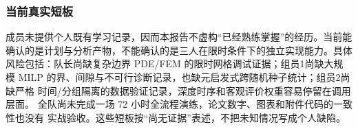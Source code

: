 \subsubsection{当前真实短板}

成员未提供个人既有学习记录，因而本报告不虚构“已经熟练掌握”的经历。当前能
确认的是计划与分析产物，不能确认的是三人在限时条件下的独立实现能力。具体
风险包括：队长尚缺复杂边界 PDE/FEM 的限时网格调试证据；组员1尚缺大规模
MILP 的界、间隙与不可行诊断记录，也缺元启发式跨随机种子统计；组员2尚缺严格
时间/分组隔离的数据验证记录，深度时序和客观评价权重容易停留在调用层面。
全队尚未完成一场 72 小时全流程演练，论文数字、图表和附件代码的一致性也没有
实战验收。这些短板按“尚无证据”表述，不把未知情况写成个人缺陷。

